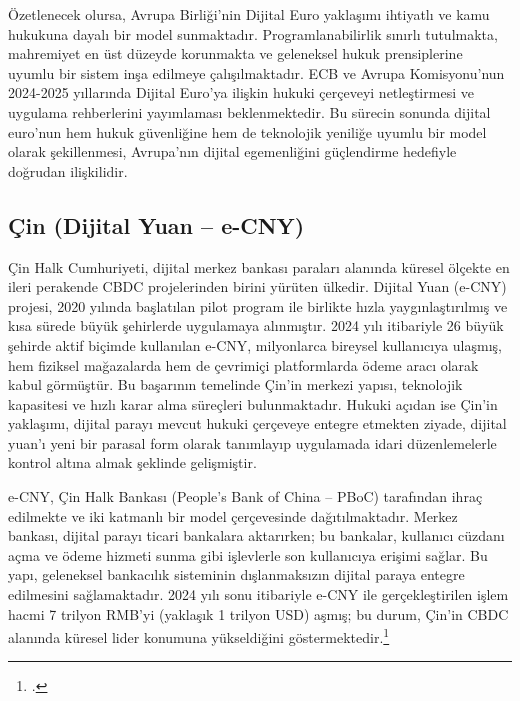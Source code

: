 \documentclass[a4paper,12pt]{article}
\begin{document}
Özetlenecek olursa, Avrupa Birliği’nin Dijital Euro yaklaşımı ihtiyatlı ve kamu hukukuna dayalı bir model sunmaktadır. Programlanabilirlik sınırlı tutulmakta, mahremiyet en üst düzeyde korunmakta ve geleneksel hukuk prensiplerine uyumlu bir sistem inşa edilmeye çalışılmaktadır. ECB ve Avrupa Komisyonu'nun 2024-2025 yıllarında Dijital Euro’ya ilişkin hukuki çerçeveyi netleştirmesi ve uygulama rehberlerini yayımlaması beklenmektedir. Bu sürecin sonunda dijital euro’nun hem hukuk güvenliğine hem de teknolojik yeniliğe uyumlu bir model olarak şekillenmesi, Avrupa'nın dijital egemenliğini güçlendirme hedefiyle doğrudan ilişkilidir.


\subsection{Çin (Dijital Yuan – e-CNY)}

Çin Halk Cumhuriyeti, dijital merkez bankası paraları alanında küresel ölçekte en ileri perakende CBDC projelerinden birini yürüten ülkedir. Dijital Yuan (e-CNY) projesi, 2020 yılında başlatılan pilot program ile birlikte hızla yaygınlaştırılmış ve kısa sürede büyük şehirlerde uygulamaya alınmıştır. 2024 yılı itibariyle 26 büyük şehirde aktif biçimde kullanılan e-CNY, milyonlarca bireysel kullanıcıya ulaşmış, hem fiziksel mağazalarda hem de çevrimiçi platformlarda ödeme aracı olarak kabul görmüştür. Bu başarının temelinde Çin’in merkezi yapısı, teknolojik kapasitesi ve hızlı karar alma süreçleri bulunmaktadır. Hukuki açıdan ise Çin’in yaklaşımı, dijital parayı mevcut hukuki çerçeveye entegre etmekten ziyade, dijital yuan’ı yeni bir parasal form olarak tanımlayıp uygulamada idari düzenlemelerle kontrol altına almak şeklinde gelişmiştir.

e-CNY, Çin Halk Bankası (People’s Bank of China – PBoC) tarafından ihraç edilmekte ve iki katmanlı bir model çerçevesinde dağıtılmaktadır. Merkez bankası, dijital parayı ticari bankalara aktarırken; bu bankalar, kullanıcı cüzdanı açma ve ödeme hizmeti sunma gibi işlevlerle son kullanıcıya erişimi sağlar. Bu yapı, geleneksel bankacılık sisteminin dışlanmaksızın dijital paraya entegre edilmesini sağlamaktadır. 2024 yılı sonu itibariyle e-CNY ile gerçekleştirilen işlem hacmi 7 trilyon RMB'yi (yaklaşık 1 trilyon USD) aşmış; bu durum, Çin'in CBDC alanında küresel lider konumuna yükseldiğini göstermektedir.\footcite{pboc2021whitepaper}
\end{document}
